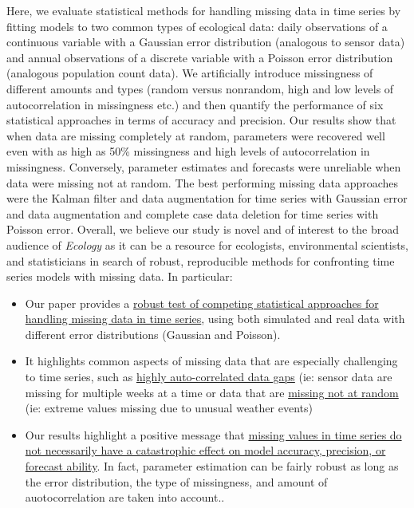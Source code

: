 \documentclass{article}
\begin{document}
Here, we evaluate statistical methods for handling missing data in time series by fitting models to two common types of ecological data: daily observations of a continuous variable with a Gaussian error distribution (analogous to sensor data) and annual observations of a discrete variable with a Poisson error distribution (analogous population count data). We artificially introduce missingness of different amounts and  types (random versus nonrandom, high and low levels of autocorrelation in missingness etc.) and then quantify the performance of six statistical approaches in terms of accuracy and precision. Our results show that when data are missing completely at random, parameters were recovered well even with as high as 50\% missingness and high levels of autocorrelation in missingness. Conversely, parameter estimates and forecasts were unreliable when data were missing not at random. The best performing missing data approaches were the Kalman filter and data augmentation for time series with Gaussian error and data augmentation and complete case data deletion for time series with Poisson error. Overall, we believe our study is novel and of interest to the broad audience of \textit{Ecology} as it can be a resource for ecologists, environmental scientists, and statisticians in search of robust, reproducible methods for confronting time series models with missing data. In particular:

\begin{itemize} 

\item {Our paper provides a \ul{robust test of competing statistical approaches for handling missing data in time series}, using both simulated and real data with different error distributions (Gaussian and Poisson).} 

\item {It highlights common aspects of missing data that are especially challenging to time series, such as \ul{highly auto-correlated data gaps} (ie: sensor data are missing for multiple weeks at a time} or data that are \ul{missing not at random} (ie: extreme values missing due to unusual weather events) 

\item {Our results highlight a positive message that \ul{missing values in time series do not necessarily have a catastrophic effect on model accuracy, precision, or forecast ability}. In fact, parameter estimation can be fairly robust as long as the error distribution, the type of missingness, and amount of auotocorrelation are taken into account.}. 

\end{itemize}
\end{document}
